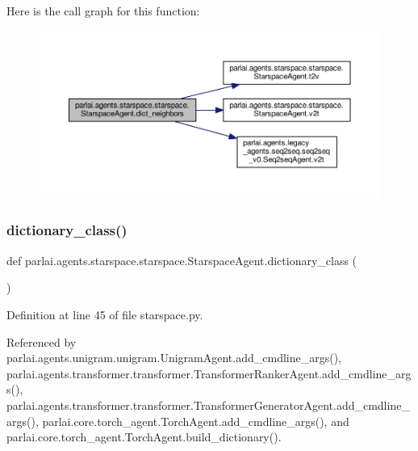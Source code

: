 Here is the call graph for this function\+:
\nopagebreak
\begin{figure}[H]
\begin{center}
\leavevmode
\includegraphics[width=350pt]{classparlai_1_1agents_1_1starspace_1_1starspace_1_1StarspaceAgent_abf3eb0a95a46ba21d819ef09465390c3_cgraph}
\end{center}
\end{figure}
\mbox{\label{classparlai_1_1agents_1_1starspace_1_1starspace_1_1StarspaceAgent_a04d4db961ea8e3ed0ca1cb4cc7a7eca5}} 
\subsubsection{\texorpdfstring{dictionary\+\_\+class()}{dictionary\_class()}}
{\footnotesize\ttfamily def parlai.\+agents.\+starspace.\+starspace.\+Starspace\+Agent.\+dictionary\+\_\+class (\begin{DoxyParamCaption}{ }\end{DoxyParamCaption})\hspace{0.3cm}{\ttfamily [static]}}



Definition at line 45 of file starspace.\+py.



Referenced by parlai.\+agents.\+unigram.\+unigram.\+Unigram\+Agent.\+add\+\_\+cmdline\+\_\+args(), parlai.\+agents.\+transformer.\+transformer.\+Transformer\+Ranker\+Agent.\+add\+\_\+cmdline\+\_\+args(), parlai.\+agents.\+transformer.\+transformer.\+Transformer\+Generator\+Agent.\+add\+\_\+cmdline\+\_\+args(), parlai.\+core.\+torch\+\_\+agent.\+Torch\+Agent.\+add\+\_\+cmdline\+\_\+args(), and parlai.\+core.\+torch\+\_\+agent.\+Torch\+Agent.\+build\+\_\+dictionary().

